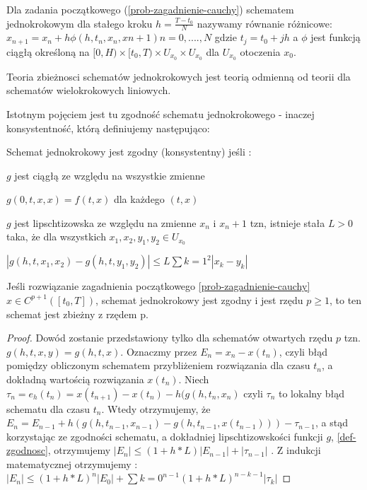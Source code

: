 \documentclass[12pt,a4paper]{report}
\begin{document}
\begin{definition}
Dla zadania początkowego (\ref{prob-zagadnienie-cauchy}) schematem jednokrokowym dla stałego kroku $h = \frac{T-t_0}{N}$ nazywamy równanie różnicowe: 
\newline $x_{n+1} = x_n + h\phi(h,t_{n},x_{n},x{n+1})  n = 0,....,N$
\newline gdzie $t_{j} = t_{0} + jh$ a $\phi$ jest funkcją ciągłą określoną na $[0,H) \times [t_0,T) \times U_{x_0} \times U_{x_0} $ dla $ U_{x_0} $ otoczenia $x_0$.   


Teoria zbieżnosci schematów jednokrokowych jest teorią odmienną od teorii dla schematów wielokrokowych liniowych. 

Istotnym pojęciem jest tu zgodność schematu jednokrokowego - inaczej konsystentność, którą definiujemy następująco: 

\begin{definition} \label{def-zgodnosc}

Schemat jednokrokowy jest zgodny (konsystentny) jeśli :

\item $g$ jest ciągłą ze względu na wszystkie zmienne
\item $g(0,t,x,x) = f(t,x)$ dla każdego $(t,x)$
\item $g$ jest lipschtizowska ze względu na zmienne $x_n$ i $x_n+1$ tzn, istnieje stała $L>0$ taka, że dla wszystkich $x_1,x_2,y_1,y_2 \in U_x_0$

$|g(h,t,x_1,x_2) - g(h,t,y_1,y_2)| \leq L\sum{k=1}^{2}|x_k - y_k|$
\end{definition}

\begin{theorem} %
Jeśli rozwiązanie zagadnienia początkowego \ref{prob-zagadnienie-cauchy} $x \in C^{p+1}([t_0,T])$, schemat jednokrokowy jest zgodny i jest rzędu $p\geqslant1$, to ten schemat jest zbieżny z rzędem p. 

\end{theorem}
\begin{proof}
Dowód zostanie przedstawiony tylko dla schematów otwartych rzędu $p$  tzn. $g(h,t,x,y) = g(h,t,x)$. 
Oznaczmy przez $E_n = x_n - x(t_n)$, czyli błąd pomiędzy obliczonym schematem przybliżeniem rozwiązania dla czasu $t_n$, a dokładną wartością rozwiązania $x(t_n)$. 
Niech $\tau_n = e_h(t_n) = x(t_{n+1}) - x(t_n) - h(g(h,t_n,x_n) $ czyli $\tau_n$ to lokalny błąd schematu dla czasu $t_n$. Wtedy otrzymujemy, że 
$E_n = E_{n-1} + h(g(h,t_{n-1},x_{n-1}) - g(h,t_{n-1},x(t_{n-1}))) - \tau_{n-1} $,
a stąd korzystając ze zgodności schematu, a dokładniej lipschtizowskości funkcji $g$, \ref{def-zgodnosc}, otrzymujemy
$|E_n| \leqslant (1 + h * L)|E_{n-1}| + |\tau_{n-1}| $ .
Z indukcji matematycznej otrzymujemy :
$|E_n| \leqslant (1 + h*L)^{n}|E_0| + \sum{k=0}^{n-1} (1+ h*L)^{n-k-1} |\tau_k| $


\end{proof}
\end{definition}
\end{document}
